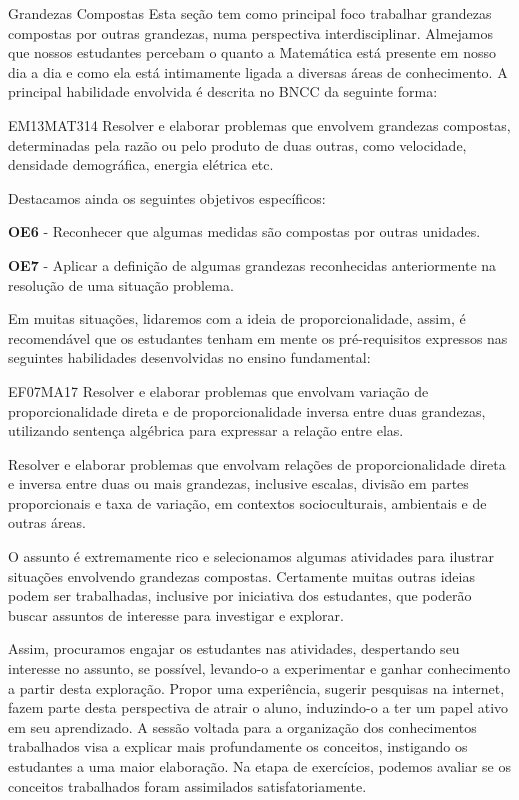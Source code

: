 \begin{paginatexto}{Grandezas Compostas}
Esta seção tem como principal foco trabalhar grandezas compostas por outras grandezas, numa perspectiva interdisciplinar. Almejamos que nossos estudantes  percebam o quanto a Matemática está presente em nosso dia a dia e  como ela está intimamente ligada a diversas áreas de conhecimento. A principal habilidade envolvida é descrita no BNCC da seguinte forma:

\begin{habilities}{EM13MAT314}  Resolver e elaborar problemas que envolvem grandezas compostas, determinadas pela razão ou pelo produto de duas outras, como velocidade, densidade demográfica, energia elétrica etc.
\end{habilities}

Destacamos ainda os seguintes  objetivos específicos:

\textbf{OE6} - Reconhecer que algumas medidas são compostas por outras unidades.

\textbf{OE7} - Aplicar a definição de algumas grandezas reconhecidas anteriormente na resolução de uma situação problema.

Em muitas situações, lidaremos com a ideia de proporcionalidade, assim, é recomendável que os estudantes  tenham em mente os pré-requisitos expressos nas seguintes habilidades desenvolvidas no ensino fundamental:

\begin{habilities}{EF07MA17} Resolver e elaborar problemas que envolvam variação de proporcionalidade direta e de proporcionalidade inversa entre duas grandezas, utilizando sentença algébrica para expressar a relação entre elas.

 Resolver e elaborar problemas que envolvam relações de proporcionalidade direta e inversa entre duas ou mais grandezas, inclusive escalas, divisão em partes proporcionais e taxa de variação, em contextos socioculturais, ambientais e de outras áreas.
\end{habilities}

O assunto é extremamente rico e selecionamos algumas atividades para ilustrar situações envolvendo grandezas compostas. Certamente muitas outras ideias podem ser trabalhadas, inclusive por iniciativa dos estudantes, que poderão buscar assuntos de interesse para investigar e explorar.

Assim, procuramos engajar os estudantes nas atividades, despertando seu interesse no assunto, se possível, levando-o a experimentar e ganhar conhecimento a partir desta exploração. Propor uma experiência, sugerir pesquisas na internet, fazem parte desta perspectiva de atrair o aluno, induzindo-o a ter um papel ativo em seu aprendizado.  A sessão voltada para a organização dos conhecimentos trabalhados visa a explicar mais profundamente os conceitos, instigando os estudantes a uma maior elaboração. Na etapa de exercícios, podemos avaliar se os conceitos trabalhados foram assimilados satisfatoriamente.


\end{paginatexto}
